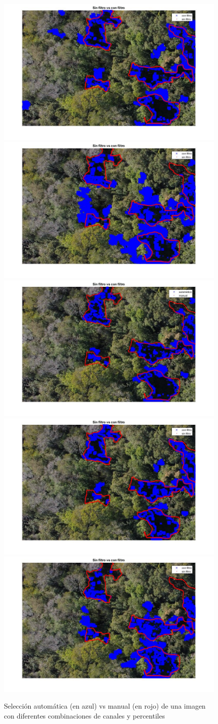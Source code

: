 \begin{figure}
    \includegraphics[width=.3\textwidth]{Imagenes/IIC/p85/BG/330a.jpg}\hfill
    \includegraphics[width=.3\textwidth]{Imagenes/IIC/p85/GR/330a.jpg}\hfill
    \\[\smallskipamount]
    \includegraphics[width=.3\textwidth]{Imagenes/IIC/p90/BR/330a.jpg}\hfill
    \includegraphics[width=.3\textwidth]{Imagenes/IIC/p90/BG/330a.jpg}\hfill
    \includegraphics[width=.3\textwidth]{Imagenes/IIC/p90/GR/330a.jpg}\hfill
    
    \caption{Selección automática (en azul) vs manual (en rojo) de una imagen con diferentes combinaciones de canales y percentiles}
\end{figure}\label{dji330}

